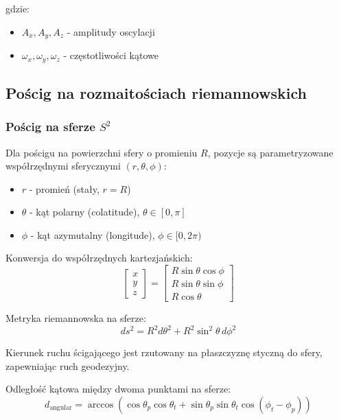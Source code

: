 \documentclass[12pt,a4paper]{article}
\begin{document}
gdzie:
\begin{itemize}
    \item $A_x, A_y, A_z$ - amplitudy oscylacji
    \item $\omega_x, \omega_y, \omega_z$ - częstotliwości kątowe
\end{itemize}

\subsection{Pościg na rozmaitościach riemannowskich}

\subsubsection{Pościg na sferze $S^2$}

Dla pościgu na powierzchni sfery o promieniu $R$, pozycje są parametryzowane współrzędnymi sferycznymi $(r, \theta, \phi)$:
\begin{itemize}
    \item $r$ - promień (stały, $r = R$)
    \item $\theta$ - kąt polarny (colatitude), $\theta \in [0, \pi]$
    \item $\phi$ - kąt azymutalny (longitude), $\phi \in [0, 2\pi)$
\end{itemize}

Konwersja do współrzędnych kartezjańskich:
\begin{equation}
\begin{bmatrix} x \\ y \\ z \end{bmatrix} = \begin{bmatrix} R \sin\theta \cos\phi \\ R \sin\theta \sin\phi \\ R \cos\theta \end{bmatrix}
\end{equation}

Metryka riemannowska na sferze:
\begin{equation}
ds^2 = R^2 d\theta^2 + R^2 \sin^2\theta \, d\phi^2
\end{equation}

Kierunek ruchu ścigającego jest rzutowany na płaszczyznę styczną do sfery, zapewniając ruch geodezyjny.

Odległość kątowa między dwoma punktami na sferze:
\begin{equation}
d_{\text{angular}} = \arccos(\cos\theta_p \cos\theta_t + \sin\theta_p \sin\theta_t \cos(\phi_t - \phi_p))
\end{equation}
\end{document}

